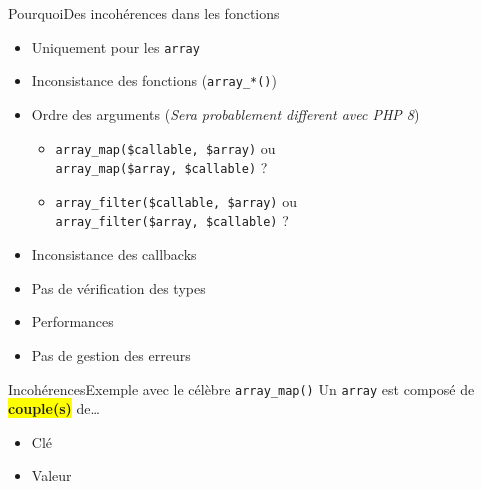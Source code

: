 \begin{frame}{Pourquoi}{Des incohérences dans les fonctions}
    \begin{itemize}[<+->]
        \item Uniquement pour les \texttt{array}
        \item Inconsistance des fonctions (\texttt{array\_*()})
        \item Ordre des arguments (\textit{Sera probablement different avec PHP 8})
        \begin{itemize}[<+->]
            \item \texttt{array\_map(\$callable, \$array)} ou \\ \texttt{array\_map(\$array, \$callable)} ?
            \item \texttt{array\_filter(\$callable, \$array)} ou \\ \texttt{array\_filter(\$array, \$callable)} ?
        \end{itemize}
        \item Inconsistance des callbacks
        \item Pas de vérification des types
        \item Performances
        \item Pas de gestion des erreurs
    \end{itemize}
\end{frame}

\begin{frame}{Incohérences}{Exemple avec le célèbre \texttt{array\_map()}}
    Un \texttt{array} est composé de \colorbox{yellow}{\textbf{couple(s)}} de\ldots

    \begin{itemize}[<+->]
        \item<1-> Clé
        \item<2-> Valeur

    \end{itemize}
\end{frame}

